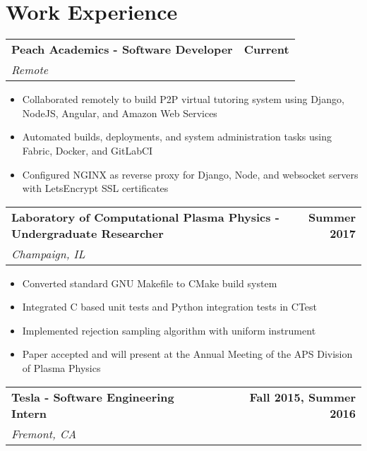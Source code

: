 \documentclass[letterpaper]{article}
\newenvironment{details}
{\begin{itemize}}
{\end{itemize}}
\begin{document}
  \section{Work Experience}
  \noindent
  \begin{tabularx}{\textwidth}{@{}X r@{}}
  	\textbf{Peach Academics - Software Developer} & \textbf{Current} \\
  	\textit{Remote}
  \end{tabularx}
  \begin{details}
  	\item Collaborated remotely to build P2P virtual tutoring system using Django, NodeJS, Angular, and Amazon Web Services 
  	\item Automated builds, deployments, and system administration tasks using Fabric, Docker, and GitLabCI
  	\item Configured NGINX  as reverse proxy for Django, Node, and websocket servers with LetsEncrypt SSL certificates
  \end{details}
	\noindent
	\begin{tabularx}{\textwidth}{@{}X r@{}}
		\textbf{Laboratory of Computational Plasma Physics - Undergraduate Researcher} & \textbf{Summer 2017} \\ \textit{Champaign, IL}
	\end{tabularx}

	\begin{details}
		\item Converted standard GNU Makefile to CMake build system 
		\item Integrated C based unit tests and Python integration tests in CTest
		\item Implemented rejection sampling algorithm with uniform instrument 
		\item Paper accepted and will present at the Annual Meeting of the APS Division of Plasma Physics
	\end{details}

  \noindent
  \begin{tabularx}{\textwidth}{@{}X r@{}}
    \textbf{Tesla - Software Engineering Intern} & \textbf{Fall 2015, Summer 2016} \\
    \textit{Fremont, CA}
  \end{tabularx}
\end{document}
